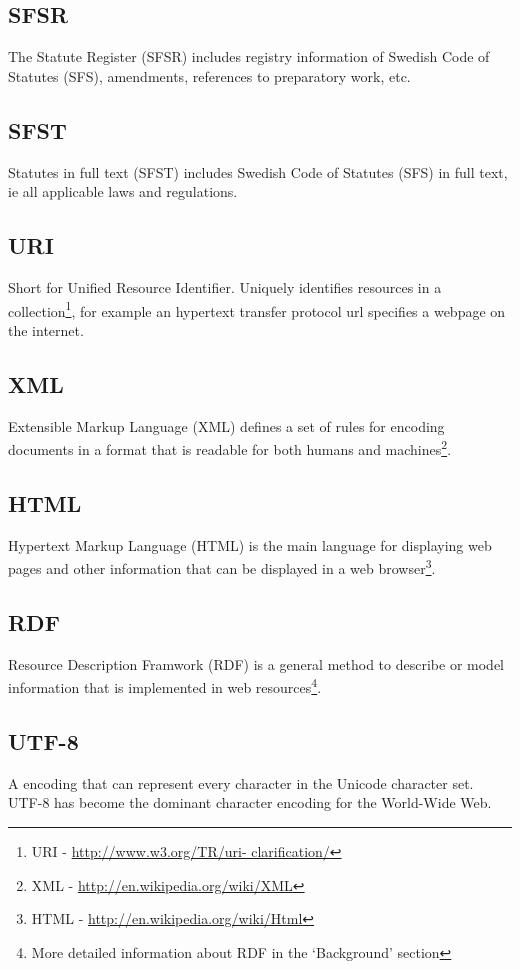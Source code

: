 \documentclass[a4paper,11pt]{kth-mag}
\begin{document}
\subsection*{SFSR}
The Statute Register (SFSR) includes registry information of Swedish Code
of Statutes (SFS), amendments, references to preparatory work, etc.

\subsection*{SFST}
Statutes in full text (SFST) includes Swedish Code of Statutes (SFS) in
full text, ie all applicable laws and regulations.

\subsection*{URI} Short for Unified Resource Identifier. Uniquely identifies
resources in a collection\footnote{URI - \url{http://www.w3.org/TR/uri-
clarification/}}, for example an hypertext transfer protocol url specifies a
webpage on the internet.

\subsection*{XML} Extensible Markup Language (XML) defines a set of rules for
encoding documents in a format that is readable for both humans and
machines\footnote{XML - \url{http://en.wikipedia.org/wiki/XML}}.

\subsection*{HTML} Hypertext Markup Language (HTML) is the main language for
displaying web pages and other information that can be displayed in a web
browser\footnote{HTML - \url{http://en.wikipedia.org/wiki/Html}}.

\subsection*{RDF} Resource Description Framwork (RDF) is a general method to
describe or model information that is implemented in web
resources\footnote{More detailed information about RDF in the ‘Background’
section}.

\subsection*{UTF-8} A encoding that can represent every character in the
Unicode character set. UTF-8 has become the dominant character encoding for
the World-Wide Web.
\end{document}
